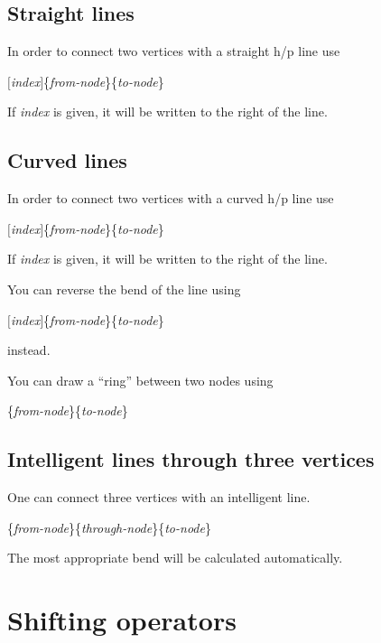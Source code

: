 \documentclass[a4paper]{article}
\newcommand{\myind}{\hspace{10pt}}
\begin{document}
\subsection{Straight lines}

In order to connect two vertices with a straight h/p line use

\myind{\bf \textbackslash dline}$[${\it index}$]$\{{\it from-node}\}\{{\it to-node}\}

If {\it index} is given, it will be written to the right of the line.

\subsection{Curved lines}

In order to connect two vertices with a curved h/p line use

\myind{\bf \textbackslash dcurve}$[${\it index}$]$\{{\it from-node}\}\{{\it to-node}\}

If {\it index} is given, it will be written to the right of the line.

You can reverse the bend of the line using 

\myind{\bf \textbackslash dcurver}$[${\it index}$]$\{{\it from-node}\}\{{\it to-node}\}

instead.

You can draw a ``ring'' between two nodes using

\myind{\bf \textbackslash dcurcur}\{{\it from-node}\}\{{\it to-node}\}

\subsection{Intelligent lines through three vertices}

One can connect three vertices with an intelligent line. 

\myind{\bf \textbackslash dcurt}\{{\it from-node}\}\{{\it through-node}\}\{{\it to-node}\}

The most appropriate bend will be calculated automatically.

\section{Shifting operators}
\end{document}
